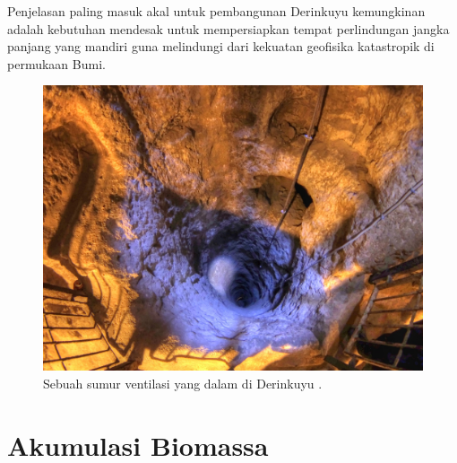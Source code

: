 \documentclass[10pt,twocolumn,letterpaper]{article}
\begin{document}
Penjelasan paling masuk akal untuk pembangunan Derinkuyu kemungkinan adalah kebutuhan mendesak untuk mempersiapkan tempat perlindungan jangka panjang yang mandiri guna melindungi dari kekuatan geofisika katastropik di permukaan Bumi.

\begin{figure}[t]
\begin{center}
   \includegraphics[width=1\linewidth]{derinkuyu-air.jpg}
\end{center}
   \caption{Sebuah sumur ventilasi yang dalam di Derinkuyu \cite{53}.}
\label{fig:6}
\label{fig:onecol}
\end{figure}


\section{Akumulasi Biomassa}
\end{document}
